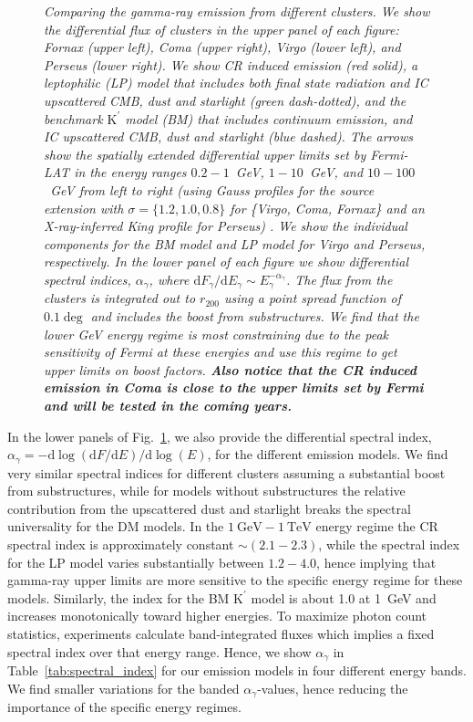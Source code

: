 \documentclass[10pt,aps,pra,reprint,amsmath,amsfonts,amssymb,showpacs,nofootinbib,floatfix]{revtex4-1}
\def\C#1{{\bf #1}}
\newcommand{\Fermi}{{\em Fermi}\xspace}
\newcommand{\rmn}{\mathrm}
\newcommand{\Kp}{\rmn{K}^\prime}
\newcommand{\gev}{\rmn{GeV}}
\newcommand{\tev}{\rmn{TeV}}
\newcommand{\dd}{\rmn{d}}
\newcommand{\rvir}{r_{200}}
\begin{document}
\begin{figure}
\begin{minipage}{2.0\columnwidth}
\caption{\it Comparing the gamma-ray emission from different
  clusters. We show the differential flux of clusters in the upper
  panel of each figure: Fornax (upper left), Coma (upper right), Virgo
  (lower left), and Perseus (lower right). We show CR induced emission
  (red solid), a leptophilic (LP) model that includes both final state
  radiation and IC upscattered CMB, dust and starlight (green
  dash-dotted), and the benchmark $\Kp$ model (BM) that includes
  continuum emission, and IC upscattered CMB, dust and starlight (blue
  dashed). The arrows show the spatially extended differential upper
  limits set by \Fermi-LAT in the energy ranges $0.2-1$~GeV,
  $1-10$~GeV, and $10-100$~GeV from left to right (using Gauss
  profiles for the source extension with $\sigma=\{1.2,1.0,0.8\}$ for
  \{Virgo, Coma, Fornax\} and an X-ray-inferred King profile for
  Perseus) \cite{2010ApJ...717L..71A}. We show the individual
  components for the BM model and LP model for Virgo and Perseus,
  respectively. In the lower panel of each figure we show differential
  spectral indices, $\alpha_\gamma$, where $\dd F_\gamma/\dd E_\gamma
  \sim E_\gamma^{-\alpha_\gamma}$. The flux from the clusters is
  integrated out to $\rvir$ using a point spread function of $0.1\deg$
  and includes the boost from substructures. We find that the lower
  GeV energy regime is most constraining due to the peak sensitivity
  of \Fermi at these energies and use this regime to get upper limits
  on boost factors. \C{Also notice that the CR induced emission in
    Coma is close to the upper limits set by \Fermi and will be tested
    in the coming years.}}
 \label{fig:clu_comp}
\end{minipage}
\end{figure}

In the lower panels of Fig.~\ref{fig:clu_comp}, we also provide the
differential spectral index, $\alpha_\gamma=-\dd \log(\dd F/\dd E)/\dd
\log(E)$, for the different emission models. We find very similar
spectral indices for different clusters assuming a substantial boost
from substructures, while for models without substructures the
relative contribution from the upscattered dust and starlight breaks
the spectral universality for the DM models. In the $1~\gev-1~\tev$
energy regime the CR spectral index is approximately constant $\sim
(2.1-2.3)$, while the spectral index for the LP model varies
substantially between $1.2-4.0$, hence implying that gamma-ray upper
limits are more sensitive to the specific energy regime for these
models. Similarly, the index for the BM $\Kp$ model is about 1.0 at
1~GeV and increases monotonically toward higher energies. To maximize
photon count statistics, experiments calculate band-integrated fluxes
which implies a fixed spectral index over that energy range. Hence, we
show $\alpha_\gamma$ in Table~\ref{tab:spectral_index} for our
emission models in four different energy bands. We find smaller
variations for the banded $\alpha_\gamma$-values, hence reducing the
importance of the specific energy regimes.
\end{document}
